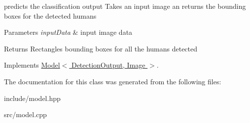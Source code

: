 predicts the classification output Takes an input image an returns the bounding boxes for the detected humans 


\begin{DoxyParams}{Parameters}
{\em input\+Data} & input image data \\
\hline
\end{DoxyParams}
\begin{DoxyReturn}{Returns}
Rectangles bounding boxes for all the humans detected 
\end{DoxyReturn}


Implements \hyperlink{classModel_aab70aeca992eb3a1ce09667e169b8743}{Model$<$ Detection\+Output, Image $>$}.



The documentation for this class was generated from the following files\+:\begin{DoxyCompactItemize}
\item 
include/model.\+hpp\item 
src/model.\+cpp\end{DoxyCompactItemize}
